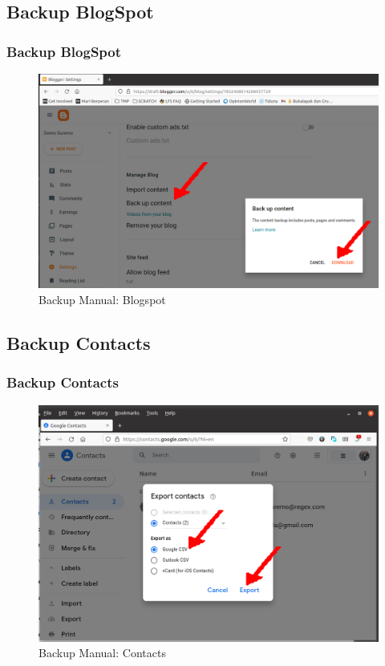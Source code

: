 \documentclass[xcolor=table, notheorems, hyperref={pdfpagelabels=false}]{beamer}
\begin{document}
\begin{frame}[fragile]
\section{Backup BlogSpot}
\frametitle{Backup BlogSpot}
\begin{figure}
\includegraphics[width=0.91\linewidth]{BlogSpot}
\caption{Backup Manual: Blogspot}
\end{figure}
\end{frame}

\begin{frame}[fragile]
\section{Backup Contacts}
\frametitle{Backup Contacts}
\begin{figure}
\includegraphics[width=0.91\linewidth]{Contacts}
\caption{Backup Manual: Contacts}
\end{figure}
\end{frame}
\end{document}
